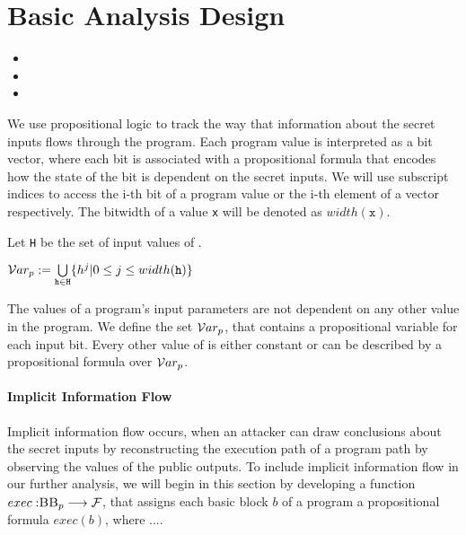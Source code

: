\section{Basic Analysis Design}

\begin{itemize}
    \item {}
    \item {}
    \item {}
\end{itemize}

We use propositional logic to track the way that information about the secret inputs flows through the program. Each program value is interpreted as a bit vector, where each bit is associated with a propositional formula that encodes how the state of the bit is dependent on the secret inputs. We will use subscript indices to access the i-th bit of a program value or the i-th element of a vector respectively. The bitwidth of a value \texttt{x} will be denoted as $width(\mathtt{x})$.

\begin{definition}
    Let \texttt{H} be the set of input values of \pp.
    \begin{center}
        $\mathcal{V}ar_p := \bigcup\limits_{\mathtt{h} \in \mathtt{H}} \{h^j | 0 \leq j \leq width(\mathtt{h})\}$
    \end{center}
    The values of a program's input parameters are not dependent on any other value in the program. We define the set $\mathcal{V}ar_p$, that contains a propositional variable for each input bit. Every other value of \p is either constant or can be described by a propositional formula over $\mathcal{V}ar_p$.
\end{definition}


\paragraph{Implicit Information Flow}
Implicit information flow occurs, when an attacker can draw conclusions about the secret inputs by reconstructing the  execution path of a program path by observing the values of the public outputs. To include implicit information flow in our further analysis, we will begin in this section by developing a function $exec: \mbb_p \longrightarrow \mbform$, that assigns each basic block $b$ of a program a propositional formula $exec(b)$, where ....

